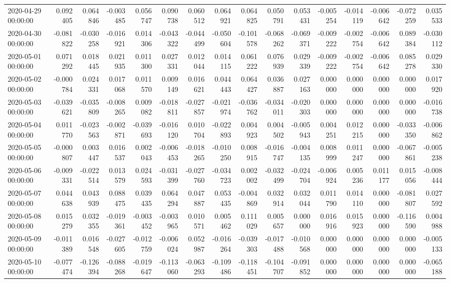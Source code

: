 \begin{tabular}{lrrrrrrrrrrrrrrr}
2020-04-29 00:00:00 & 0.092405 & 0.064846 & -0.003485 & 0.056747 & 0.090738 & 0.060512 & 0.064921 & 0.064825 & 0.050791 & 0.053431 & -0.005254 & -0.014119 & -0.006642 & -0.072259 & 0.035533 \\
2020-04-30 00:00:00 & -0.081822 & -0.030258 & -0.016921 & 0.014306 & -0.043322 & -0.044499 & -0.050604 & -0.101578 & -0.068262 & -0.069371 & -0.009222 & -0.002754 & -0.006642 & 0.089384 & -0.030112 \\
2020-05-01 00:00:00 & 0.071292 & 0.018445 & 0.021935 & 0.011300 & 0.027331 & 0.012044 & 0.014115 & 0.061222 & 0.076939 & 0.029339 & -0.009222 & -0.002754 & -0.006642 & 0.085278 & 0.029330 \\
2020-05-02 00:00:00 & -0.000784 & 0.024331 & 0.017068 & 0.011570 & 0.009149 & 0.016621 & 0.044443 & 0.064427 & 0.036887 & 0.027163 & 0.000000 & 0.000000 & 0.000000 & 0.000000 & 0.017920 \\
2020-05-03 00:00:00 & -0.039621 & -0.035809 & -0.008265 & 0.009082 & -0.018811 & -0.027857 & -0.021974 & -0.036762 & -0.034011 & -0.020303 & 0.000000 & 0.000000 & 0.000000 & 0.000000 & -0.016738 \\
2020-05-04 00:00:00 & 0.011770 & -0.023563 & -0.002871 & -0.039693 & -0.016120 & 0.010704 & -0.022893 & 0.004923 & 0.004502 & -0.005943 & 0.004251 & 0.012215 & 0.000000 & -0.033350 & -0.006862 \\
2020-05-05 00:00:00 & -0.000807 & 0.003447 & 0.016537 & 0.002043 & -0.006453 & -0.018265 & -0.010250 & 0.008915 & -0.016747 & -0.004135 & 0.008999 & 0.011247 & 0.000000 & -0.067861 & -0.005238 \\
2020-05-06 00:00:00 & -0.009331 & -0.022514 & 0.013579 & 0.024593 & -0.031399 & -0.027760 & -0.034723 & 0.002002 & -0.032499 & -0.024704 & -0.006924 & 0.005236 & 0.011177 & 0.015056 & -0.008444 \\
2020-05-07 00:00:00 & 0.044638 & 0.043939 & 0.088475 & 0.039435 & 0.064294 & 0.047887 & 0.053435 & -0.004869 & 0.032914 & 0.032044 & 0.011790 & 0.014110 & 0.000000 & -0.081807 & 0.027592 \\
2020-05-08 00:00:00 & 0.015279 & 0.032355 & -0.019361 & -0.003452 & -0.003965 & 0.010571 & 0.005462 & 0.111029 & 0.005657 & 0.000000 & 0.016916 & 0.015923 & 0.000000 & -0.116590 & 0.004988 \\
2020-05-09 00:00:00 & -0.011389 & 0.016548 & -0.027605 & -0.012759 & -0.006024 & 0.052987 & -0.016264 & -0.039303 & -0.017488 & -0.010568 & 0.000000 & 0.000000 & 0.000000 & 0.000000 & -0.005133 \\
2020-05-10 00:00:00 & -0.077474 & -0.126394 & -0.088268 & -0.019647 & -0.113060 & -0.063293 & -0.109486 & -0.118451 & -0.104707 & -0.091852 & 0.000000 & 0.000000 & 0.000000 & 0.000000 & -0.065188 \\

\end{tabular}
